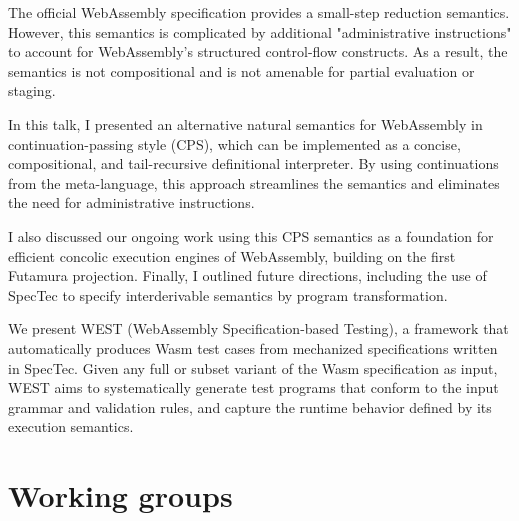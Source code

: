 \documentclass[a4paper,UKenglish]{dagrep-v2018}
\begin{document}
\license
{}

The official WebAssembly specification provides a small-step reduction semantics. However, this semantics is complicated by additional "administrative instructions" to account for WebAssembly's structured control-flow constructs. As a result, the semantics is not compositional and is not amenable for partial evaluation or staging.

In this talk, I presented an alternative natural semantics for WebAssembly in continuation-passing style (CPS), which can be implemented as a concise, compositional, and tail-recursive definitional interpreter. By using continuations from the meta-language, this approach streamlines the semantics and eliminates the need for administrative instructions.

I also discussed our ongoing work using this CPS semantics as a foundation for efficient concolic execution engines of WebAssembly, building on the first Futamura projection. Finally, I outlined future directions, including the use of SpecTec to specify interderivable semantics by program transformation.

\license

We present WEST (WebAssembly Specification-based Testing), a framework that automatically produces Wasm test cases from mechanized specifications written in SpecTec. Given any full or subset variant of the Wasm specification as input, WEST aims to systematically generate test programs that conform to the input grammar and validation rules, and capture the runtime behavior defined by its execution semantics.



\section{Working groups}

\license
\end{document}
